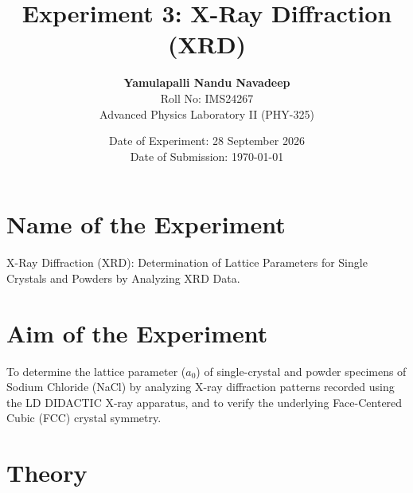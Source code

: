 \documentclass[12pt,a4paper]{article}
\title{\textbf{Experiment 3: X-Ray Diffraction (XRD)}}
\author{\textbf{Yamulapalli Nandu Navadeep} \\
Roll No: IMS24267 \\
Advanced Physics Laboratory II (PHY-325)}
\date{Date of Experiment: 28 September 2026 \\
Date of Submission: \today}
\begin{document}
\maketitle

\section{Name of the Experiment}
X-Ray Diffraction (XRD): Determination of Lattice Parameters for Single Crystals and Powders by Analyzing XRD Data.

\section{Aim of the Experiment}
To determine the lattice parameter ($a_0$) of single-crystal and powder specimens of Sodium Chloride (NaCl) by analyzing X-ray diffraction patterns recorded using the LD DIDACTIC X-ray apparatus, and to verify the underlying Face-Centered Cubic (FCC) crystal symmetry.

\section{Theory}
\end{document}
